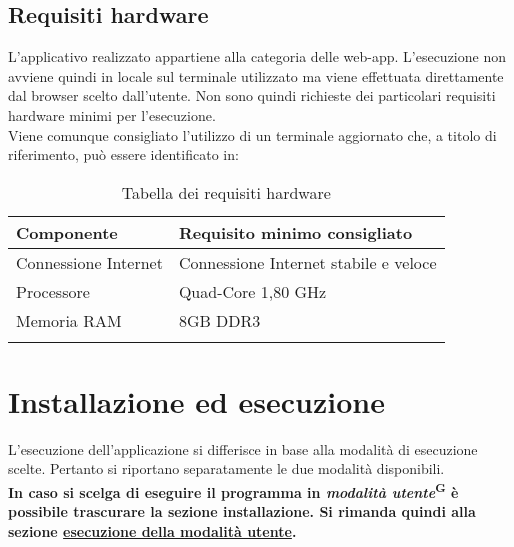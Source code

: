     \subsection{Requisiti hardware}\label{sec:requisiti_e_compatibilità:hardware}
    L'applicativo realizzato appartiene alla categoria delle web-app. L'esecuzione non avviene quindi in locale sul terminale utilizzato ma viene effettuata direttamente dal 
    browser scelto dall'utente. Non sono quindi richieste dei particolari requisiti hardware minimi per l'esecuzione.\\
    Viene comunque consigliato l'utilizzo di un terminale aggiornato che, a titolo di riferimento, può essere identificato in:
    \begin{xltabular}{\textwidth}{ X | X}

        \textbf{\color{white} Componente} & \textbf{\color{white} Requisito minimo consigliato}\\ 
        \hline
        \endhead
        
        Connessione Internet & Connessione Internet stabile e veloce \\
        \hline

        Processore & Quad-Core 1,80 GHz \\
        \hline
        
        Memoria RAM & 8GB DDR3 \\
        \hline

        \caption{Tabella dei requisiti hardware}
        \label{tab:requisiti:hard}
    \end{xltabular}

    \newpage

    

\section{Installazione ed esecuzione}\label{sec:install_run}

    L'esecuzione dell'applicazione si differisce in base alla modalità di esecuzione scelte. Pertanto si riportano separatamente le due modalità disponibili. \\
    \textbf{In caso si scelga di eseguire il programma in \textit{modalità utente}\textsuperscript{G} è possibile trascurare la sezione installazione. Si rimanda quindi alla 
    sezione \hyperref[sec:install_run:user]{esecuzione della modalità utente}.} \\ 

